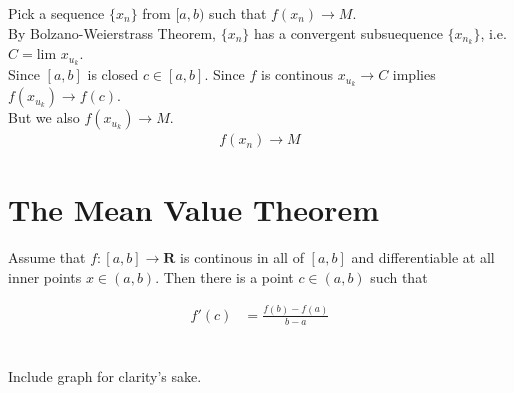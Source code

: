 \documentclass[12pt,letterpaper]{article}
\begin{document}
Pick a sequence $\{x_n\}$ from $[a,b)$ such that $f(x_n)\to M$.\\

By Bolzano-Weierstrass Theorem, $\{x_n\}$ has a convergent subsuequence $\{x_{n_k}\}$, i.e. $C = \text{lim } x_{u_k}$.\\

Since $[a,b]$ is closed $c\in [a,b]$. Since $f$ is continous $x_{u_k}\to C$ implies $f(x_{u_k})\to f(c)$.\\

 But we also $f(x_{u_k}) \to M$.\\

\begin{align*}
	f(x_n) \to M
\end{align*}













\section*{The Mean Value Theorem}
Assume that $f : [a,b] \to \mathbf{R}$ is continous in all of $[a,b]$ and differentiable at all inner points $x \in (a,b)$. Then there is a point $c \in (a,b)$ such that 

\begin{align*}
	f'(c) &= \frac{f(b)-f(a)}{b-a} \\
\end{align*}

\noindent \\
Include graph for clarity's sake.


\end{document}
